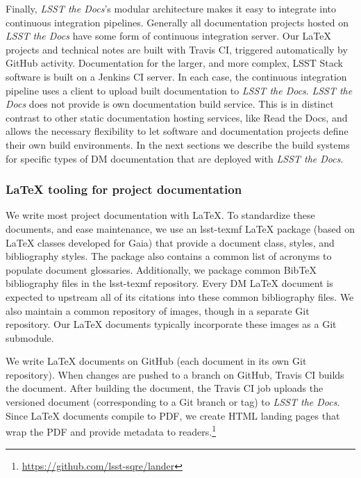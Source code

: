 Finally, \textit{LSST the Docs}'s modular architecture makes it easy to integrate into continuous integration pipelines.
Generally all documentation projects hosted on \textit{LSST the Docs} have some form of continuous integration server.
Our LaTeX projects and technical notes are built with Travis CI, triggered automatically by GitHub activity.
Documentation for the larger, and more complex, LSST Stack software is built on a Jenkins CI server.
In each case, the continuous integration pipeline uses a client to upload built documentation to \textit{LSST the Docs}.
\textit{LSST the Docs} does not provide is own documentation build service.
This is in distinct contrast to other static documentation hosting services, like Read the Docs, and allows the necessary flexibility to let software and documentation projects define their own build environments.
In the next sections we describe the build systems for specific types of DM documentation that are deployed with \textit{LSST the Docs}.

\subsubsection{LaTeX tooling for project documentation}
\label{sec:latex_tooling}

We write most project documentation with LaTeX.
To standardize these documents, and ease maintenance, we use an lsst-texmf\cite{lsst-texmf} LaTeX package (based on LaTeX classes developed for Gaia) that provide a document class, styles, and bibliography styles.
The package also contains a common list of acronyms to populate document glossaries.
Additionally, we package common BibTeX bibliography files in the lsst-texmf repository.
Every DM LaTeX document is expected to upstream all of its citations into these common bibliography files.
We also maintain a common repository of images, though in a separate Git repository.
Our LaTeX documents typically incorporate these images as a Git submodule.

We write LaTeX documents on GitHub (each document in its own Git repository).
When changes are pushed to a branch on GitHub, Travis CI builds the document.
After building the document, the Travis CI job uploads the versioned document (corresponding to a Git branch or tag) to \textit{LSST the Docs}.
Since LaTeX documents compile to PDF, we create HTML landing pages that wrap the PDF and provide metadata to readers.\footnote{\url{https://github.com/lsst-sqre/lander}}

